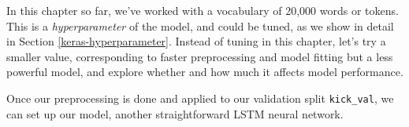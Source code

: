 \documentclass[
]{krantz}
\makeatletter
\newenvironment{Shaded}{\begin{snugshade}}{\end{snugshade}}
\newcommand{\AttributeTok}[1]{\textcolor[rgb]{0.77,0.63,0.00}{#1}}
\newcommand{\DecValTok}[1]{\textcolor[rgb]{0.00,0.00,0.81}{#1}}
\newcommand{\FloatTok}[1]{\textcolor[rgb]{0.00,0.00,0.81}{#1}}
\newcommand{\FunctionTok}[1]{\textcolor[rgb]{0.00,0.00,0.00}{#1}}
\newcommand{\NormalTok}[1]{#1}
\newcommand{\OtherTok}[1]{\textcolor[rgb]{0.56,0.35,0.01}{#1}}
\newcommand{\SpecialCharTok}[1]{\textcolor[rgb]{0.00,0.00,0.00}{#1}}
\newcommand{\StringTok}[1]{\textcolor[rgb]{0.31,0.60,0.02}{#1}}
\newenvironment{kframe}{%
\medskip{}
\setlength{\fboxsep}{.8em}
 \def\at@end@of@kframe{}%
 \ifinner\ifhmode%
  \def\at@end@of@kframe{\end{minipage}}%
  \begin{minipage}{\columnwidth}%
 \fi\fi%
 \def\FrameCommand##1{\hskip\@totalleftmargin \hskip-\fboxsep
 \colorbox{shadecolor}{##1}\hskip-\fboxsep
     \hskip-\linewidth \hskip-\@totalleftmargin \hskip\columnwidth}%
 \MakeFramed {\advance\hsize-\width
   \@totalleftmargin\z@ \linewidth\hsize
   \@setminipage}}%
 {\par\unskip\endMakeFramed%
 \at@end@of@kframe}
\renewenvironment{Shaded}{\begin{kframe}}{\end{kframe}}
\makeatother
\begin{document}
In this chapter so far, we've worked with a vocabulary of 20,000 words or tokens. This is a \emph{hyperparameter} of the model, and could be tuned, as we show in detail in Section \ref{keras-hyperparameter}. Instead of tuning in this chapter, let's try a smaller value, corresponding to faster preprocessing and model fitting but a less powerful model, and explore whether and how much it affects model performance.

\begin{Shaded}
\end{Shaded}

Once our preprocessing is done and applied to our validation split \texttt{kick\_val}, we can set up our model, another straightforward LSTM neural network.
\end{document}
